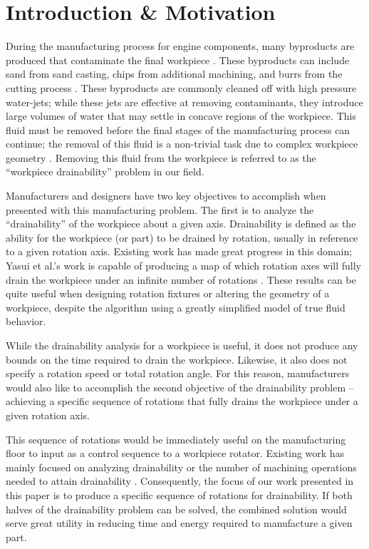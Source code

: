							\chapter{Introduction \& Motivation}



During the manufacturing process for engine components, many byproducts are produced that contaminate the final workpiece \cite{Hancock94}. These byproducts can include sand from sand casting, chips from additional machining, and burrs from the cutting process \cite{Arbelaez}.
These byproducts are commonly cleaned off with high pressure water-jets; while these jets are effective at removing contaminants, they introduce large volumes of water that may settle in concave regions of the workpiece. This fluid must be removed before the final stages of the manufacturing process can continue; the removal of this fluid is a non-trivial task due to complex workpiece geometry \cite{Avila} \cite{Yasui2011}. Removing this fluid from the workpiece is referred to as the ``workpiece drainability'' problem in our field.

Manufacturers and designers have two key objectives to accomplish when presented with this manufacturing problem. The first is to analyze the ``drainability'' of the workpiece about a given axis. Drainability is defined as the ability for the workpiece (or part) to be drained by rotation, usually in reference to a given rotation axis. Existing work has made great progress in this domain; Yasui et al.'s work is capable of producing a map of which rotation axes will fully drain the workpiece under an infinite number of rotations \cite{Yasui2011}. These results can be quite useful when designing rotation fixtures or altering the geometry of a workpiece, despite the algorithm using a greatly simplified model of true fluid behavior.

While the drainability analysis for a workpiece is useful, it does not produce any bounds on the time required to drain the workpiece. Likewise, it also does not specify a rotation speed or total rotation angle. For this reason, manufacturers would also like to accomplish the second objective of the drainability problem -- achieving a specific sequence of rotations that fully drains the workpiece under a given rotation axis.

This sequence of rotations would be immediately useful on the manufacturing floor to input as a control sequence to a workpiece rotator. Existing work has mainly focused on analyzing drainability \cite{Yasui2011} or the number of machining operations needed to attain drainability \cite{Aloupis_draininga}. Consequently, the focus of our work presented in this paper is to produce a specific sequence of rotations for drainability. If both halves of the drainability problem can be solved, the combined solution would serve great utility in reducing time and energy required to manufacture a given part.

